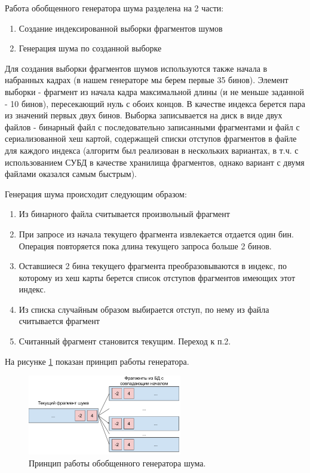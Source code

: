 \documentclass[a4paper,14pt]{extreport}
\begin{document}
Работа обобщенного генератора шума разделена на 2 части:

\begin{enumerate}
    \item Создание индексированной выборки фрагментов шумов
    \item Генерация шума по созданной выборке
\end{enumerate}

Для создания выборки фрагментов шумов используются также начала в набранных кадрах (в нашем генераторе мы берем первые 35 бинов). Элемент выборки - фрагмент из начала кадра максимальной длины (и не меньше заданной - 10 бинов), пересекающий нуль с обоих концов. В качестве индекса берется пара из значений первых двух бинов. Выборка записывается на диск в виде двух файлов - бинарный файл с последовательно записанными фрагментами и файл с сериализованной хеш картой, содержащей списки отступов фрагментов в файле для каждого индекса (алгоритм был реализован в нескольких вариантах, в т.ч. с использованием СУБД в качестве хранилища фрагментов, однако вариант с двумя файлами оказался самым быстрым).

Генерация шума происходит следующим образом:

\begin{enumerate}
    \item Из бинарного файла считывается произвольный фрагмент
    \item При запросе из начала текущего фрагмента извлекается отдается один бин. Операция повторяется пока длина текущего запроса больше 2 бинов.
    \item Оставшиеся 2 бина текущего фрагмента преобразовываются в индекс, по которому из хеш карты берется список отступов фрагментов имеющих этот индекс.
    \item Из списка случайным образом выбирается отступ, по нему из файла считывается фрагмент
    \item Считанный фрагмент становится текущим. Переход к п.2. 
\end{enumerate}

На рисунке \ref{fig:signals-noise-generator-workflow} показан принцип работы генератора.

\begin{figure}
  \centering
  \includegraphics[width = 0.6\textwidth]{img/signals/noise-generator-workflow.pdf}
  \caption{Принцип работы обобщенного генератора шума.}
  \label{fig:signals-noise-generator-workflow}
\end{figure}
\end{document}
